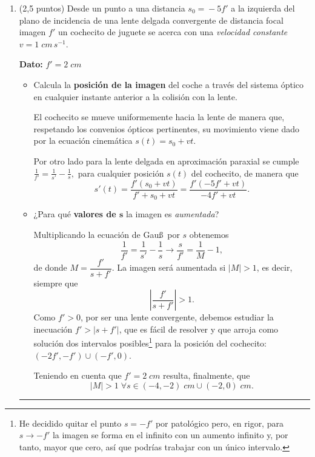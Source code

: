 \documentclass[a4paper,14pt]{extarticle}
\newcommand{\halmos}{
\vspace*{-1ex}

\begin{flushright}
\rule{1mm}{2.5mm} \end{flushright}
\vspace*{-3ex}

}
\renewcommand{\qed}{\halmos}
\begin{document}
\begin{enumerate}
							
			 \qed
    \newpage
    \item (2,5 puntos) Desde un punto a una distancia $s_0\!=\!-5f'$ a la izquierda del plano de incidencia de una lente delgada convergente de distancia focal imagen $f'$ un cochecito de juguete se acerca con una \textit{velocidad constante} $v=1\;cm\,s^{-1}$.
    \vspace{1ex}
    
    	\textbf{Dato:} $f'=2\;cm$ 
			\begin{itemize}
				\item[a)] Calcula la \textbf{posición de la imagen} del coche a través del sistema óptico en cualquier instante anterior a la colisión con la lente.
				\begin{mdframed}[backgroundcolor=brown!10] 
				El cochecito se mueve uniformemente hacia la lente de manera que, respetando los convenios ópticos pertinentes, su movimiento viene dado por la ecuación cinemática $s(t)=s_0+vt.$
				
				Por otro lado para la lente delgada en aproximación paraxial se cumple
				$\frac{1}{f'}=\frac{1}{s'}-\frac{1}{s},$
				para cualquier posición $s(t)$ del cochecito, de manera que
				$$\boxed{s'(t)=\frac{f'(s_0+vt)}{f'+s_0+vt}=\frac{f'(-5f'+vt)}{-4f'+vt}.}$$ 
				\end{mdframed}
				\item[b)] ¿Para qué \textbf{valores de $\mathbf{s}$} la imagen es \textit{aumentada}? 
				\begin{mdframed}[backgroundcolor=brown!10] 
				Multiplicando la ecuación de Gau\ss\, por $s$ obtenemos
				$$\frac{1}{f'}=\frac{1}{s'}-\frac{1}{s}\longrightarrow \frac{s}{f'}=\frac{1}{M}-1,$$
				de donde $M=\dfrac{f'}{s+f'}$.	La imagen será aumentada si $\lvert M\rvert>1$, es decir, siempre que
				$$\left\lvert\frac{f'}{s+f'}\right\rvert>1.$$
				Como $f'>0$, por ser una lente convergente, debemos estudiar la inecuación $f'>\lvert s+f'\rvert$, que es fácil de resolver y que arroja como solución dos intervalos posibles\footnote{He decidido quitar el punto $s=-f'$ por patológico pero, en rigor, para $s\to -f'$ la imagen se forma en el infinito con un aumento infinito y, por tanto, mayor que cero, así que podrías trabajar con un único intervalo.} para la posición del cochecito: $ (-2f',-f')\cup(-f',0)$.
				
				Teniendo en cuenta que $f'=2\;cm$ resulta, finalmente, que
				$$\boxed{\lvert M\rvert>1\;\forall s\in (-4,-2)\;cm\cup (-2,0)\;cm.}$$
				
				\end{mdframed}
			\end{itemize}
			
				
				
			\qed

    
\end{enumerate}
\end{document}
